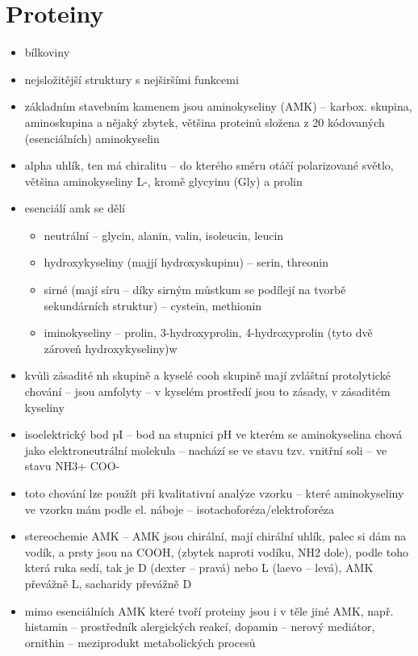 \documentclass{article}
\begin{document}
\section{Proteiny}
\begin{itemize}
  \item bílkoviny
  \item nejsložitější struktury s nejširšími funkcemi
  \item základním stavebním kamenem jsou aminokyseliny (AMK) -- karbox. skupina, aminoskupina a nějaký zbytek, většina proteinů složena z 20 kódovaných (esenciálních) aminokyselin
  \item alpha uhlík, ten má chiralitu -- do kterého směru otáčí polarizované světlo, většina aminokyseliny L-, kromě glycyinu (Gly) a prolin
  \item esenciálí amk se dělí
  \begin{itemize}
    \item neutrální -- glycin, alanin, valin, isoleucin, leucin
    \item hydroxykyseliny (majjí hydroxyskupinu) -- serin, threonin
    \item sirné (mají síru -- díky sirným můstkum se podílejí na tvorbě sekundárních struktur) -- cystein, methionin
    \item iminokyseliny -- prolin, 3-hydroxyprolin, 4-hydroxyprolin (tyto dvě zároveň hydroxykyseliny)w
  \end{itemize}
  \item kvůli zásadité nh skupině a kyselé cooh skupině mají zvláštní protolytické chování -- jsou amfolyty -- v kyselém prostředí jsou to zásady, v zásaditém kyseliny
  \item isoelektrický bod pI -- bod na stupnici pH ve kterém se aminokyselina chová jako elektroneutrální molekula -- nachází se ve stavu tzv. vnitřní soli -- ve stavu NH3+ COO-
  \item toto chování lze použít při kvalitativní analýze vzorku -- které aminokyseliny ve vzorku mám podle el. náboje -- isotachoforéza/elektroforéza
  \item stereochemie AMK -- AMK jsou chirální, mají chirální uhlík, palec si dám na vodík, a prsty jsou na COOH, (zbytek naproti vodíku, NH2 dole), podle toho která ruka sedí, tak je D (dexter -- pravá) nebo L (laevo -- levá), AMK převážně L, sacharidy převážně D
  \item mimo esenciálních AMK které tvoří proteiny jsou i v těle jiné AMK, např. histamin -- prostředník alergických reakcí, dopamin -- nerový mediátor, ornithin -- meziprodukt metabolických procesů

\end{itemize}
\end{document}
